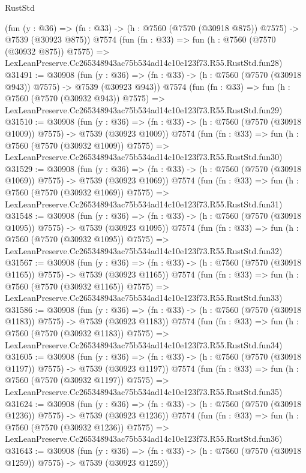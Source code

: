 \begin{lexlean}{RustStd}
\begin{coremodule}
    (fun (y : @36) => (fn : @33) -> (h : @7560 (@7570 (@30918 @875)) @7575) -> @7539 (@30923 @875))
    @7574
    (fun (fn : @33) =>
    fun (h : @7560 (@7570 (@30932 @875)) @7575) =>
    LexLeanPreserve.Cc265348943ac75b534ad14c10e123f73.R55.RustStd.fun28)
@31491 := @30908
    (fun (y : @36) => (fn : @33) -> (h : @7560 (@7570 (@30918 @943)) @7575) -> @7539 (@30923 @943))
    @7574
    (fun (fn : @33) =>
    fun (h : @7560 (@7570 (@30932 @943)) @7575) =>
    LexLeanPreserve.Cc265348943ac75b534ad14c10e123f73.R55.RustStd.fun29)
@31510 := @30908
    (fun (y : @36) =>
    (fn : @33) -> (h : @7560 (@7570 (@30918 @1009)) @7575) -> @7539 (@30923 @1009))
    @7574
    (fun (fn : @33) =>
    fun (h : @7560 (@7570 (@30932 @1009)) @7575) =>
    LexLeanPreserve.Cc265348943ac75b534ad14c10e123f73.R55.RustStd.fun30)
@31529 := @30908
    (fun (y : @36) =>
    (fn : @33) -> (h : @7560 (@7570 (@30918 @1069)) @7575) -> @7539 (@30923 @1069))
    @7574
    (fun (fn : @33) =>
    fun (h : @7560 (@7570 (@30932 @1069)) @7575) =>
    LexLeanPreserve.Cc265348943ac75b534ad14c10e123f73.R55.RustStd.fun31)
@31548 := @30908
    (fun (y : @36) =>
    (fn : @33) -> (h : @7560 (@7570 (@30918 @1095)) @7575) -> @7539 (@30923 @1095))
    @7574
    (fun (fn : @33) =>
    fun (h : @7560 (@7570 (@30932 @1095)) @7575) =>
    LexLeanPreserve.Cc265348943ac75b534ad14c10e123f73.R55.RustStd.fun32)
@31567 := @30908
    (fun (y : @36) =>
    (fn : @33) -> (h : @7560 (@7570 (@30918 @1165)) @7575) -> @7539 (@30923 @1165))
    @7574
    (fun (fn : @33) =>
    fun (h : @7560 (@7570 (@30932 @1165)) @7575) =>
    LexLeanPreserve.Cc265348943ac75b534ad14c10e123f73.R55.RustStd.fun33)
@31586 := @30908
    (fun (y : @36) =>
    (fn : @33) -> (h : @7560 (@7570 (@30918 @1183)) @7575) -> @7539 (@30923 @1183))
    @7574
    (fun (fn : @33) =>
    fun (h : @7560 (@7570 (@30932 @1183)) @7575) =>
    LexLeanPreserve.Cc265348943ac75b534ad14c10e123f73.R55.RustStd.fun34)
@31605 := @30908
    (fun (y : @36) =>
    (fn : @33) -> (h : @7560 (@7570 (@30918 @1197)) @7575) -> @7539 (@30923 @1197))
    @7574
    (fun (fn : @33) =>
    fun (h : @7560 (@7570 (@30932 @1197)) @7575) =>
    LexLeanPreserve.Cc265348943ac75b534ad14c10e123f73.R55.RustStd.fun35)
@31624 := @30908
    (fun (y : @36) =>
    (fn : @33) -> (h : @7560 (@7570 (@30918 @1236)) @7575) -> @7539 (@30923 @1236))
    @7574
    (fun (fn : @33) =>
    fun (h : @7560 (@7570 (@30932 @1236)) @7575) =>
    LexLeanPreserve.Cc265348943ac75b534ad14c10e123f73.R55.RustStd.fun36)
@31643 := @30908
    (fun (y : @36) =>
    (fn : @33) -> (h : @7560 (@7570 (@30918 @1259)) @7575) -> @7539 (@30923 @1259))

\end{coremodule}
\end{lexlean}
